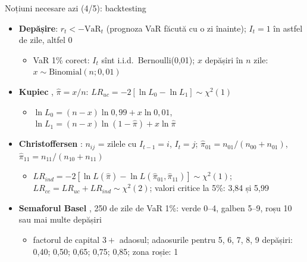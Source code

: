 \begin{frame}{Noțiuni necesare azi (4/5): backtesting}
\itemsize{\footnotesize}
\begin{itemize}
    \item \textbf{Depășire}: $r_t < -\mathrm{VaR}_t$ (prognoza VaR făcută cu o zi înainte); $I_t = 1$ în astfel de zile, altfel 0
    \begin{itemize}
        \item VaR 1\% corect: $I_t$ sînt i.i.d.\ Bernoulli(0,01); $x$ depășiri în $n$ zile: $x \sim \mathrm{Binomial}(n; 0{,}01)$
    \end{itemize}
    \item \textbf{Kupiec} , $\hat\pi = x/n$: $LR_{uc} = -2[\ln L_0 - \ln L_1] \sim \chi^2(1)$
    \begin{itemize}
        \item $\ln L_0 = (n - x)\ln 0{,}99 + x\ln 0{,}01$, \quad $\ln L_1 = (n - x)\ln(1 - \hat\pi) + x\ln\hat\pi$
    \end{itemize}
    \item \textbf{Christoffersen} : $n_{ij}$ = zilele cu $I_{t-1} = i$, $I_t = j$; $\hat\pi_{01} = n_{01}/(n_{00} + n_{01})$, $\hat\pi_{11} = n_{11}/(n_{10} + n_{11})$
    \begin{itemize}
        \item $LR_{ind} = -2[\ln L(\hat\pi) - \ln L(\hat\pi_{01}, \hat\pi_{11})] \sim \chi^2(1)$; $LR_{cc} = LR_{uc} + LR_{ind} \sim \chi^2(2)$; valori critice la 5\%: 3,84 și 5,99
    \end{itemize}
    \item \textbf{Semaforul Basel} , 250 de zile de VaR 1\%: verde 0--4, galben 5--9, roșu 10 sau mai multe depășiri
    \begin{itemize}
        \item factorul de capital $3 + $ adaosul; adaosurile pentru 5, 6, 7, 8, 9 depășiri: 0,40; 0,50; 0,65; 0,75; 0,85; zona roșie: 1
    \end{itemize}
\end{itemize}
\end{frame}

